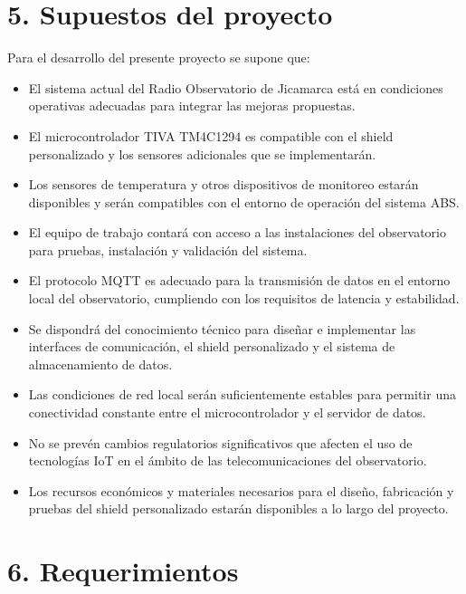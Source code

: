 \documentclass[
11pt, %
]{charter}
\begin{document}
\section{5. Supuestos del proyecto}
\label{sec:supuestos}

Para el desarrollo del presente proyecto se supone que:
\begin{itemize}
	\item El sistema actual del Radio Observatorio de Jicamarca está en condiciones operativas adecuadas para integrar las mejoras propuestas.

	\item El microcontrolador TIVA TM4C1294 es compatible con el shield personalizado y los sensores adicionales que se implementarán.

	\item Los sensores de temperatura y otros dispositivos de monitoreo estarán disponibles y serán compatibles con el entorno de operación del sistema ABS.

	\item El equipo de trabajo contará con acceso a las instalaciones del observatorio para pruebas, instalación y validación del sistema.

	\item El protocolo MQTT es adecuado para la transmisión de datos en el entorno local del observatorio, cumpliendo con los requisitos de latencia y estabilidad.

	\item Se dispondrá del conocimiento técnico para diseñar e implementar las interfaces de comunicación, el shield personalizado y el sistema de almacenamiento de datos.

	\item Las condiciones de red local serán suficientemente estables para permitir una conectividad constante entre el microcontrolador y el servidor de datos.

	\item No se prevén cambios regulatorios significativos que afecten el uso de tecnologías IoT en el ámbito de las telecomunicaciones del observatorio.

	\item Los recursos económicos y materiales necesarios para el diseño, fabricación y pruebas del shield personalizado estarán disponibles a lo largo del proyecto.
\end{itemize}

\section{6. Requerimientos}
\label{sec:requerimientos}
\end{document}
